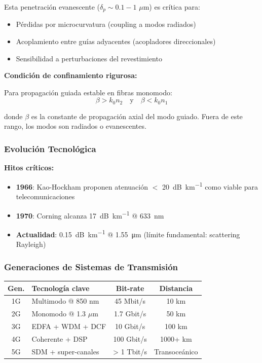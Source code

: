 \documentclass[11pt,a4paper]{article}
\begin{document}
Esta penetración evanescente ($\delta_p \sim 0.1-1$ $\mu$m) es crítica para:
\begin{itemize}
    \item Pérdidas por microcurvatura (coupling a modos radiados)
    \item Acoplamiento entre guías adyacentes (acopladores direccionales)
    \item Sensibilidad a perturbaciones del revestimiento
\end{itemize}

\begin{importante}
\textbf{Condición de confinamiento rigurosa:}

Para propagación guiada estable en fibras monomodo:
\begin{equation}
    \beta > k_0 n_2 \quad \text{y} \quad \beta < k_0 n_1
\end{equation}

donde $\beta$ es la constante de propagación axial del modo guiado. Fuera de este rango, los modos son radiados o evanescentes.
\end{importante}

\subsubsection{Evolución Tecnológica}

\begin{importante}
\textbf{Hitos críticos:}
\begin{itemize}
    \item \textbf{1966}: Kao-Hockham proponen atenuación $<$ \SI{20}{\dB\per\km} como viable para telecomunicaciones
    \item \textbf{1970}: Corning alcanza \SI{17}{\dB\per\km} @ \SI{633}{\nm}
    \item \textbf{Actualidad}: \SI{0.15}{\dB\per\km} @ \SI{1.55}{\um} (límite fundamental: scattering Rayleigh)
\end{itemize}
\end{importante}

\subsubsection{Generaciones de Sistemas de Transmisión}

\begin{table}[h]
\centering
\begin{tabular}{clcc}
\hline
\textbf{Gen.} & \textbf{Tecnología clave} & \textbf{Bit-rate} & \textbf{Distancia} \\
\hline
1G & Multimodo @ 850 nm & 45 Mbit/s & 10 km \\
2G & Monomodo @ 1.3 $\mu$m & 1.7 Gbit/s & 50 km \\
3G & EDFA + WDM + DCF & 10 Gbit/s & 100 km \\
4G & Coherente + DSP & 100 Gbit/s & 1000+ km \\
5G & SDM + super-canales & > 1 Tbit/s & Transoceánico \\
\hline
\end{tabular}
\end{table}
\end{document}
